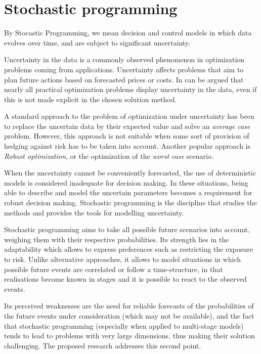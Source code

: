 
%
%
\label{ch:Warmstart}

%
%
%
\section{Stochastic programming}

By Stocastic Programming, we mean decision and control models in which 
data evolves over time, and are subject to significant uncertainty.

\hrulefill

Uncertainty in the data is a commonly observed phenomenon in
optimization problems coming from applications. Uncertainty
affects problems that aim to plan future actions based on forecasted
prices or costs. In can be argued that nearly all practical
optimization problems display uncertainty in the data, even if this is
not made explicit in the chosen solution method. 

A standard approach to the problem of optimization under uncertainty
has been to replace the uncertain data by their expected value and
solve an {\em average case} problem. However, this approach is not
suitable when some sort of provision of hedging against risk has to be
taken into account. Another popular approach is {\em Robust
optimization}, or the optimization of the {\em worst case}
scenario. 

When the uncertainty cannot be conveniently forecasted, the use of 
deterministic models is considered inadequate for decision making. In 
these situations, being able to describe and model the uncertain parameters
becomes a requirement for robust decision making. Stochastic 
programming \cite{KallWallace} is the discipline that studies the 
methods and provides the tools for modelling uncertainty.

Stochastic programming aims to take all possible future scenarios 
into account, weighing them
with their respective probabilities. Its strength lies in the
adaptability which allows to express preferences such as restricting
the exposure to risk. Unlike alternative approaches, it allows to model
situations in which possible future events are correlated or follow a
time-structure, in that realisations become known in stages and it is
possible to react to the observed events.

Its perceived weaknesses are the need for reliable forecasts
of the probabilities of the future events under consideration
(which may not be available), and the fact that stochastic programming
(especially when applied to multi-stage models) tends to lead to
problems with very large dimensions, thus making their solution
challenging. The proposed research addresses this second point.

